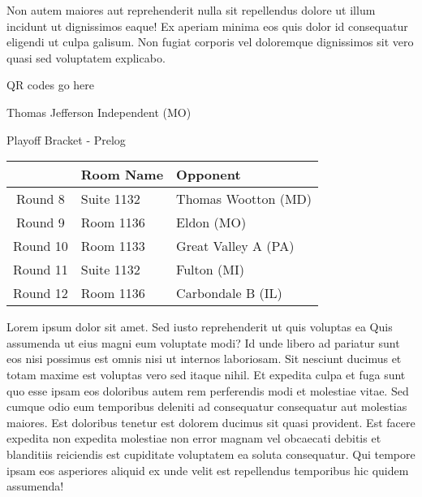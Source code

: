 \documentclass{article}%
\begin{document}
\newline%
Non autem maiores aut reprehenderit nulla sit repellendus dolore ut illum incidunt ut dignissimos eaque! Ex aperiam minima eos quis dolor id consequatur eligendi ut culpa galisum. Non fugiat corporis vel doloremque dignissimos sit vero quasi sed voluptatem explicabo.\newline%
\newline%
%
\vspace*{30pt}%
\begin{center}%
\begin{Huge}%
QR codes go here%
\end{Huge}%
\end{center}%
\newpage%
\begin{center}%
\begin{Huge}%
Thomas Jefferson Independent (MO)%
\end{Huge}%
\vspace*{8pt}%
\linebreak%
\begin{Large}%
Playoff Bracket {-} Prelog%
\end{Large}%
\end{center}%
\begin{tabularx}{\textwidth}{|c|Y|Y|}%
\hline%
&Room Name&Opponent\\%
\hline%
Round 8&Suite 1132&Thomas Wootton (MD)\\%
Round 9&Room 1136&Eldon (MO)\\%
Round 10&Room 1133&Great Valley A (PA)\\%
Round 11&Suite 1132&Fulton (MI)\\%
Round 12&Room 1136&Carbondale B (IL)\\%
\hline%
\end{tabularx}%
\vspace*{8pt}%
\linebreak%
\newline%
\newline%
Lorem ipsum dolor sit amet. Sed iusto reprehenderit ut quis voluptas ea Quis assumenda ut eius magni eum voluptate modi? Id unde libero ad pariatur sunt eos nisi possimus est omnis nisi ut internos laboriosam. Sit nesciunt ducimus et totam maxime est voluptas vero sed itaque nihil. Et expedita culpa et fuga sunt quo esse ipsam eos doloribus autem rem perferendis modi et molestiae vitae.\newline%
\newline%
Sed cumque odio eum temporibus deleniti ad consequatur consequatur aut molestias maiores. Est doloribus tenetur est dolorem ducimus sit quasi provident. Est facere expedita non expedita molestiae non error magnam vel obcaecati debitis et blanditiis reiciendis est cupiditate voluptatem ea soluta consequatur. Qui tempore ipsam eos asperiores aliquid ex unde velit est repellendus temporibus hic quidem assumenda!\newline%
\end{document}
